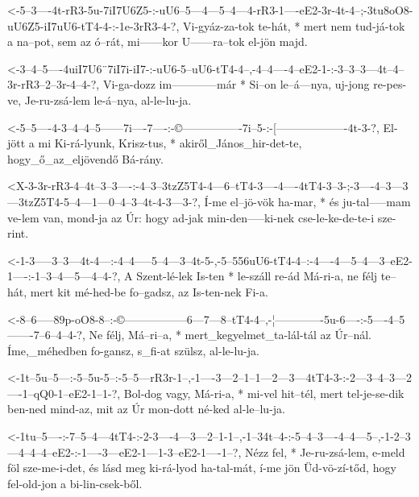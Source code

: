   {<-5--3----4t-rR3-5u-7iI7U6Z5-:-uU6--5---4---5--4---4-rR3-1----eE2-3r-4t-4--;-3tu8oO8-uU6Z5-iI7uU6-tT4-4-:-1e-3rR3-4-?,}
  {  Vi-gyáz-za-tok te-hát,     * mert nem tud-já-tok a na--pot, sem az ó--rát, mi------kor   U------ra--tok el-jön  majd.}


  {<-3--4--5----4uiI7U6¨7iI7i-iI7-:-uU6-5--uU6-tT4-4--,-4--4----4--eE2-1-:-3--3--3---4t--4--3r-rR3--2--3r-4--4-?,}
  {  Vi-ga-dozz im------------már * Si--on le--á---nya, uj-jong re-pes-ve, Je-ru-zsá-lem le-á--nya, al-le-lu-ja.}

  {<-5--5----4-3--4--4--5------7i----7----:-©----------------7i--5-:-[-------------------4t-3-?,}
  {  El-jött a mi Ki-rá-lyunk, Krisz-tus, * akiről_János_hir-det-te, hogy_ő_az_eljövendő Bá-rány.}

  {<X-3-3r-rR3-4--4t--3--3----:-4--3--3tzZ5T4-4---6--tT4-3----4----4tT4-3--3-;-3----4--3---3---3tzZ5T4-5--4---1---0--4--3--4t-4-3---3-?,}
  {   Í-me el--jö-vök ha-mar, * és ju-tal-----mam ve-lem van, mond-ja   az Úr: hogy ad-jak min-den-----ki-nek cse-le-ke-de-te-i sze-rint.}

  {<-1-3-----3--3---4t-4---:-4--4-----5--4---3--4t-5-,-5--556uU6-tT4-4--:-4----4---5--4---3--eE2-1----:-1--3--4---5---4--4-?,}
  {  A Szent-lé-lek Is-ten * le-száll re-ád  Má-ri-a,  ne félj   te--hát, mert kit mé-hed-be fo--gadsz, az Is-ten-nek Fi-a.}

  {<-8--6-----89p-oO8-8--:-©-----------------6---7---8--tT4-4--,-¦-------------5u-6----:-5----4--5-------7--6--4--4-?,}
  {  Ne félj, Má--ri--a, * mert_kegyelmet_ta-lál-tál az Úr--nál. Íme,_méhedben fo-gansz, s_fi-at szülsz, al-le-lu-ja.}

  {<-1t--5u--5---:-5--5u-5--:-5--5---rR3r-1--,-1----3---2--1--1---2---3---4tT4-3-:-2---3--4--3---2----1--qQ0-1--eE2-1--1-?,}
  {  Bol-dog vagy, Má-ri-a, * mi-vel hit--tél, mert tel-je-se-dik ben-ned mind-az, mit az Úr mon-dott né-ked al-le--lu-ja.}


  {<-1tu--5----:-7--5--4---4tT4-:-2-3----4---3---2--1-1--,-1--34t--4-:-5--4--3----4--4---5--,-1-2--3---4--4--4--eE2-:-1----3---eE2-1---1-3--eE2-1----1--?,}
  {  Nézz fel, * Je-ru-zsá-lem,   e-meld föl sze-me-i-det, és lásd meg ki-rá-lyod ha-tal-mát, í-me jön Üd-vö-zí-tőd,  hogy fel-old-jon a bi-lin-csek-ből.}

